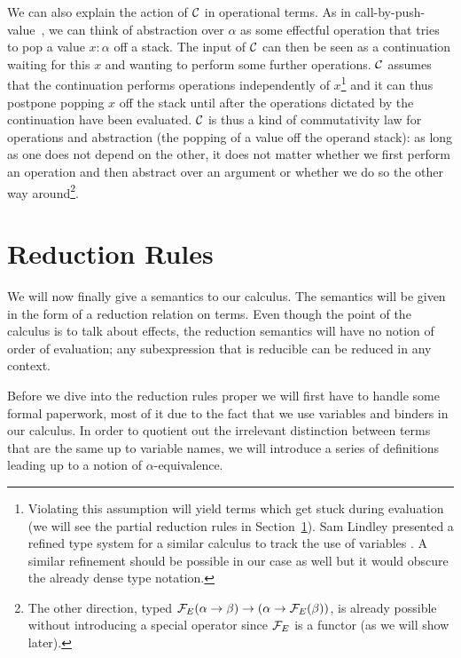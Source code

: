We can also explain the action of $\mathcal{C}$ in operational terms. As in
call-by-push-value~\cite{levy1999call}, we can think of abstraction over
$\alpha$ as some effectful operation that tries to pop a value $x : \alpha$
off a stack. The input of $\mathcal{C}$ can then be seen as a continuation waiting
for this $x$ and wanting to perform some further operations. $\mathcal{C}$ assumes
that the continuation performs operations independently of
$x$\footnote{Violating this assumption will yield terms which get stuck
  during evaluation (we will see the partial reduction rules in
  Section~\ref{sec:reductions}). Sam Lindley presented a refined type
  system for a similar calculus to track the use of variables
  \cite{lindley2014algebraic}. A similar refinement should be possible in
  our case as well but it would obscure the already dense type notation.}
and it can thus postpone popping $x$ off the stack until after the
operations dictated by the continuation have been evaluated. $\mathcal{C}$ is thus
a kind of commutativity law for operations and abstraction (the popping of
a value off the operand stack): as long as one does not depend on the
other, it does not matter whether we first perform an operation and then
abstract over an argument or whether we do so the other way
around\footnote{The other direction, typed $\mathcal{F}_E(\alpha \to \beta) \to
  (\alpha \to \mathcal{F}_E(\beta))$, is already possible without introducing a
  special operator since $\mathcal{F}_E$ is a functor (as we will show later).}.


\section{Reduction Rules}
\label{sec:reductions}

We will now finally give a semantics to our calculus. The semantics will be
given in the form of a reduction relation on terms. Even though the point
of the calculus is to talk about effects, the reduction semantics will have
no notion of order of evaluation; any subexpression that is reducible can
be reduced in any context.

Before we dive into the reduction rules proper we will first have to handle
some formal paperwork, most of it due to the fact that we use variables and
binders in our calculus. In order to quotient out the irrelevant
distinction between terms that are the same up to variable names, we will
introduce a series of definitions leading up to a notion of
$\alpha$-equivalence.

